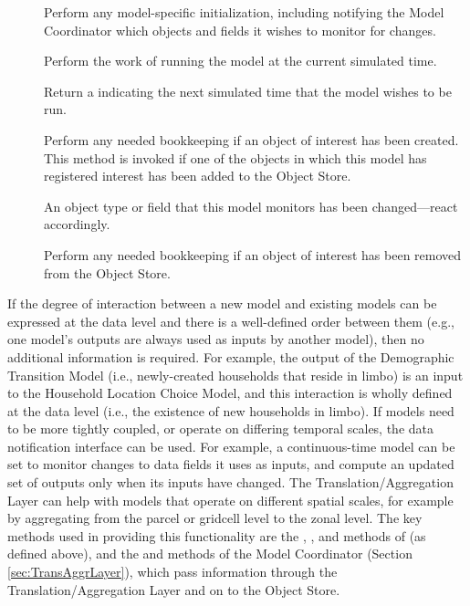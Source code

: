 \begin{description}

\item[] Perform any model-specific initialization, including
notifying the Model Coordinator which objects and fields it wishes to
monitor for changes.

\item[] Perform the work of running the model at the current
simulated time.

\item[] Return a  indicating the
next simulated time that the model wishes to be run.

\item[] Perform any needed bookkeeping if an object of
interest has been created.  This method is invoked if one of the objects in
which this model has registered interest has been added to the Object
Store.

\item[] An object type or field that this model monitors has
been changed---react accordingly.

\item[] Perform any needed bookkeeping if an object of
interest has been removed from the Object Store.

\end{description}

If the degree of interaction between a new model and existing models can be
expressed at the data level and there is a well-defined order between them
(e.g., one model's outputs are always used as inputs by another model),
then no additional information is required.  For example, the output of the
Demographic Transition Model (i.e., newly-created households that reside in
limbo) is an input to the Household Location Choice Model, and this
interaction is wholly defined at the data level (i.e., the existence of new
households in limbo).  If models need to be more tightly coupled, or
operate on differing temporal scales, the data notification interface can
be used.  For example, a continuous-time model can be set to monitor
changes to data fields it uses as inputs, and compute an updated set of
outputs only when its inputs have changed.  The Translation/Aggregation
Layer can help with models that operate on different spatial scales, for
example by aggregating from the parcel or gridcell level to the zonal
level.  The key methods used in providing this functionality are the
, , and  methods of
 (as defined above), and the  and
 methods of the Model Coordinator (Section
\ref{sec:TransAggrLayer}), which pass information through the
Translation/Aggregation Layer and on to the Object Store.

